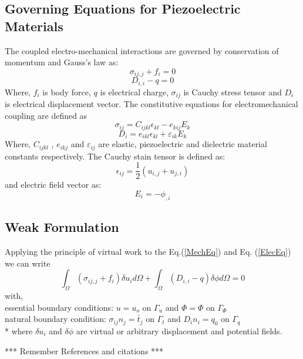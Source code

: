 \documentclass[12pt]{article}
\begin{document}
\subsection{Governing Equations for Piezoelectric Materials}
The coupled electro-mechanical interactions are governed by conservation of momentum and Gauss's law as:
\begin{equation} \label{MechEq}
\sigma_{ij,j} + f_i = 0
\end{equation} 
\begin{equation} \label{ElecEq}
D_{i,i} - q = 0
\end{equation}
Where, $ f_i $ is body force, $ q $ is electrical charge, $ \sigma_{ij} $ is Cauchy stress tensor and $ D_i $ is electrical displacement vector.
The constitutive equations for electromechanical coupling are defined as
\begin{equation}
\sigma_{ij} = C_{ijkl} \epsilon_{kl} - e_{kij} E_k
\end{equation}
\begin{equation}
D_i = e_{ikl} \epsilon_{kl} + \varepsilon_{ik} E_k
\end{equation}
Where, $ C_{ijkl} $ , $ e_{ikj} $ and $ \varepsilon_{ij} $ are elastic, piezoelectric and dielectric material constants respectively. The Cauchy stain tensor is defined as:
\begin{equation}
\epsilon_{ij} = \frac{1}{2} (u_{i,j} + u_{j,i})
\end{equation}
and electric field vector as:
\begin{equation}
E_i = -\phi_{,i}
\end{equation}
\subsection{Weak Formulation}
Applying the principle of virtual work to the Eq.(\ref{MechEq})
and Eq. (\ref{ElecEq}) we can write
\begin{equation}
\int_\Omega ( \sigma_{ij,j} + f_i ) \delta u_i d\Omega + \int_\Omega (D_{i,i} - q ) \delta \phi d\Omega = 0
\end{equation}
with, \\
essential boundary conditions:
$u = u_o$ on $\Gamma_u$ and $\Phi=\Phi$ on $\Gamma_\Phi$ \\
natural boundary condition:
$\sigma_{ij}n_j = \bar{t}_j$ on $\Gamma_t$ and $D_i n_i = q_0$ on $\Gamma_q$ \\*
where $\delta u_i$ and $\delta \phi$ are virtual or arbitrary displacement and potential fields.




\noindent
*** Remember References and citations ***
\end{document}
